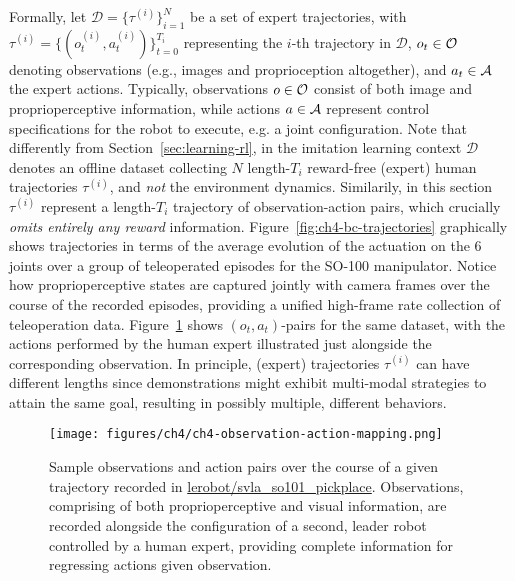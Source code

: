 Formally, let \( \mathcal D = \{ \tau^{(i)} \}_{i=1}^N \) be a set of expert trajectories, with \( \tau^{(i)} = \{(o_t^{(i)}, a_t^{(i)})\}_{t=0}^{T_i} \) representing the \(i\)-th trajectory in \( \mathcal D \), \(o_t \in \mathcal O \) denoting observations (e.g., images and proprioception altogether), and \(a_t \in \mathcal A \) the expert actions.
Typically, observations \( o \in \mathcal O \) consist of both image and proprioperceptive information, while actions \( a \in \mathcal A \) represent control specifications for the robot to execute, e.g. a joint configuration.
Note that differently from Section~\ref{sec:learning-rl}, in the imitation learning context \( \mathcal D \) denotes an offline dataset collecting \( N \) length-\( T_i \) reward-free (expert) human trajectories \( \tau^{(i)} \), and \emph{not} the environment dynamics.
Similarily, in this section \( \tau^{(i)} \) represent a length-\(T_i\) trajectory of observation-action pairs, which crucially \emph{omits entirely any reward} information.
Figure~\ref{fig:ch4-bc-trajectories} graphically shows trajectories in terms of the average evolution of the actuation on the 6 joints over a group of teleoperated episodes for the SO-100 manipulator.
Notice how proprioperceptive states are captured jointly with camera frames over the course of the recorded episodes, providing a unified high-frame rate collection of teleoperation data.
Figure~\ref{fig:ch4-observation-action-mapping} shows \( (o_t, a_t) \)-pairs for the same dataset, with the actions performed by the human expert illustrated just alongside the corresponding observation.
In principle, (expert) trajectories \( \tau^{(i)} \) can have different lengths since demonstrations might exhibit multi-modal strategies to attain the same goal, resulting in possibly multiple, different behaviors.

\begin{figure}
    \centering
    \texttt{[image: figures/ch4/ch4-observation-action-mapping.png]}
    \caption{Sample observations and action pairs over the course of a given trajectory recorded in \url{lerobot/svla_so101_pickplace}. Observations, comprising of both proprioperceptive and visual information, are recorded alongside the configuration of a second, leader robot controlled by a human expert, providing complete information for regressing actions given observation.}
    \label{fig:ch4-observation-action-mapping}
\end{figure}

